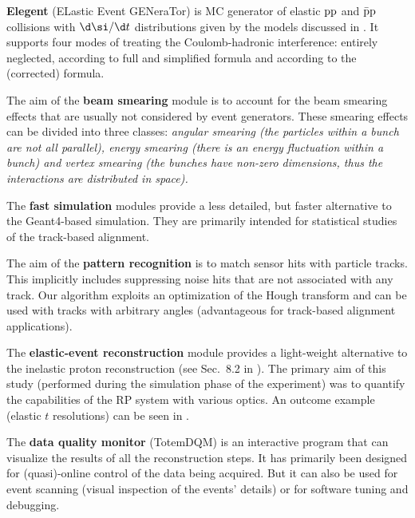 \> {\bf Elegent} (ELastic Event GENeraTor) is MC generator of elastic $\rm pp$ and $\rm\bar pp$ collisions with $\d\si/\d t$ distributions given by the models discussed in . It supports four modes of treating the Coulomb-hadronic interference: entirely neglected, according to full and simplified \WY{} formula and according to the (corrected) \KL{} formula.

\> The aim of the {\bf beam smearing} module is to account for the beam smearing effects that are usually not considered by event generators. These smearing effects can be divided into three classes: \em{angular smearing} (the particles within a bunch are not all parallel), \em{energy smearing} (there is an energy fluctuation within a bunch) and \em{vertex smearing} (the bunches have non-zero dimensions, thus the interactions are distributed in space). 

\> The {\bf fast simulation} modules provide a less detailed, but faster alternative to the Geant4-based simulation. They are primarily intended for statistical studies of the track-based alignment.

\> The aim of the {\bf pattern recognition} is to match sensor hits with particle tracks. This implicitly includes suppressing noise hits that are not associated with any track. Our algorithm exploits an optimization of the Hough transform and can be used with tracks with arbitrary angles (advantageous for track-based alignment applications).

\> The {\bf elastic-event reconstruction} module provides a light-weight alternative to the inelastic proton reconstruction (see Sec.~8.2 in ). The primary aim of this study (performed during the simulation phase of the experiment) was to quantify the capabilities of the RP system with various optics. An outcome example (elastic $t$ resolutions) can be seen in .


\> The {\bf data quality monitor} (TotemDQM) is an interactive program that can visualize the results of all the reconstruction steps. It has primarily been designed for (quasi)-online control of the data being acquired. But it can also be used for event scanning (visual inspection of the events' details) or for software tuning and debugging.



